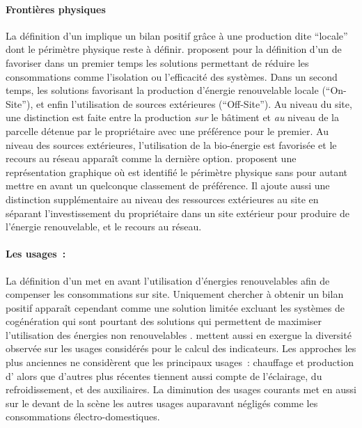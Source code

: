 \paragraph{Frontières physiques} %
\label{par:frontières_physiques}
La définition d’un  implique un bilan positif grâce à une production dite
\enquote{locale} dont le périmètre physique reste à définir.
\textcite{Torcellini2006} proposent pour la définition d’un  de favoriser dans un
premier temps les solutions permettant de réduire les consommations comme l’isolation ou
l’efficacité des systèmes. Dans un second temps, les solutions favorisant
la production d’énergie renouvelable locale (\enquote{On-Site}), et enfin
l’utilisation de sources extérieures (\enquote{Off-Site}). Au niveau du site, une
distinction est faite entre la production \emph{sur} le bâtiment et \emph{au} niveau de la
parcelle détenue par le propriétaire avec une préférence pour le premier.
Au niveau des sources extérieures, l’utilisation de la bio-énergie est favorisée et
le recours au réseau apparaît comme la dernière option.
\textcite{Marszal2010} proposent une représentation graphique où est identifié le
périmètre physique sans pour autant mettre en avant un quelconque classement de
préférence. Il ajoute aussi une distinction supplémentaire au niveau des ressources
extérieures au site en séparant l’investissement du propriétaire dans un site extérieur
pour produire de l’énergie renouvelable, et le recours au réseau.

\paragraph{Les usages~:} %
\label{par:les_usages}
La définition d’un  met en avant l’utilisation d’énergies renouvelables afin de
compenser les consommations sur site. Uniquement chercher à obtenir un bilan positif
apparaît cependant comme une solution limitée excluant les systèmes de cogénération qui
sont pourtant des solutions qui permettent de maximiser l’utilisation des énergies non
renouvelables \parencite{Sartori2010}.
\textcite{Marszal2011971} mettent aussi en exergue la diversité observée sur les usages considérés pour le calcul
des indicateurs. Les approches les plus anciennes ne considèrent que les principaux usages~: chauffage
et production d’ alors que d’autres plus récentes tiennent aussi compte de l’éclairage,
du refroidissement, et des auxiliaires. La diminution des usages courants met en aussi
sur le devant de la scène les autres usages auparavant négligés comme les consommations électro-domestiques.


